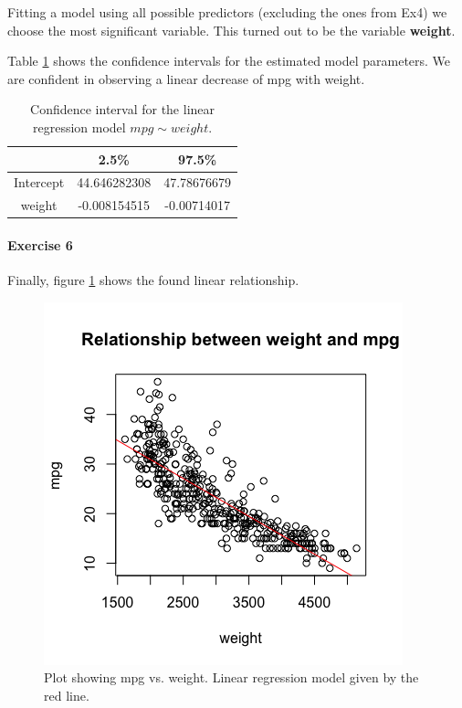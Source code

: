 \documentclass{paper}
\begin{document}
Fitting a model using all possible predictors (excluding the ones from Ex4)
we choose the most significant variable. This turned out to be the variable \textbf{weight}.

Table \ref{tab:confMPG} shows the confidence intervals for the estimated model
parameters. We are confident in observing a linear decrease of mpg with weight.

\begin{table}[!h]
  \centering
    \caption{Confidence interval for the linear regression model $mpg\sim weight$.}
    \label{tab:confMPG}
    \begin{tabular}{|c|c|c|}
      \hline
                      & 2.5\%         & 97.5\%          \\ \hline
      Intercept       & 44.646282308  & 47.78676679    \\ \hline
      weight            & -0.008154515    & -0.00714017      \\ \hline
    \end{tabular}
\end{table}


\paragraph{Exercise 6}

Finally, figure \ref{fig:mpg} shows the found linear relationship.

\begin{figure}[!h]
  \begin{center}
    \quad\quad
    \includegraphics[width=.6\linewidth]{mpg}
  \end{center}
  \caption{Plot showing mpg vs. weight. Linear regression
   model given by the red line.}
   \label{fig:mpg}
\end{figure}
\end{document}
